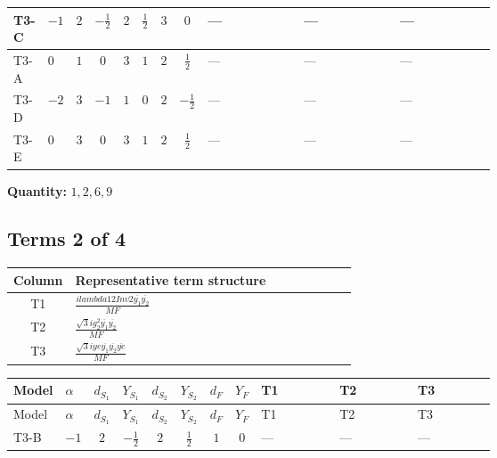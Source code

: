 \documentclass[8pt]{article}
\begin{document}
\begin{landscape}
\begin{longtable}{@{}llcccccc >{\raggedright\arraybackslash}p{0.21\linewidth} >{\raggedright\arraybackslash}p{0.21\linewidth} >{\raggedright\arraybackslash}p{0.21\linewidth}@{}}
\midrule
T3-C & $-1$ & $2$ & $-\frac{1}{2}$ & $2$ & $\frac{1}{2}$ & $3$ & $0$ & --- & --- & --- \\
\midrule
T3-A & $0$ & $1$ & $0$ & $3$ & $1$ & $2$ & $\frac{1}{2}$ & --- & --- & --- \\
\midrule
T3-D & $-2$ & $3$ & $-1$ & $1$ & $0$ & $2$ & $-\frac{1}{2}$ & --- & --- & --- \\
\midrule
T3-E & $0$ & $3$ & $0$ & $3$ & $1$ & $2$ & $\frac{1}{2}$ & --- & --- & --- \\
\midrule
\bottomrule
\end{longtable}
\clearpage
\noindent\textbf{Quantity: }$\mathrm{1,2,6,9}$\par\smallskip
\subsection*{Terms 2 of 4}
\begin{center}
\begin{tabular}{@{}c >{\raggedright\arraybackslash}p{0.82\linewidth}@{}}
\toprule
Column & Representative term structure \\
\midrule
T1 & \(\displaystyle \frac{i lambda12Inv2 \overline{y_{1}} \overline{y_{2}}}{MF}\) \\
\midrule
T2 & \(\displaystyle \frac{\sqrt{3} i g_{2}^{2} \overline{y_{1}} \overline{y_{2}}}{MF}\) \\
\midrule
T3 & \(\displaystyle \frac{\sqrt{3} i ye \overline{y_{1}} \overline{y_{2}} \overline{ye}}{MF}\) \\
\midrule
\bottomrule
\end{tabular}
\end{center}
\smallskip
\tiny
\begin{longtable}{@{}llcccccc >{\raggedright\arraybackslash}p{0.21\linewidth} >{\raggedright\arraybackslash}p{0.21\linewidth} >{\raggedright\arraybackslash}p{0.21\linewidth}@{}}
\toprule
Model & $\alpha$ & $d_{S_1}$ & $Y_{S_1}$ & $d_{S_2}$ & $Y_{S_2}$ & $d_F$ & $Y_F$ & T1 & T2 & T3 \\
\midrule
\endfirsthead
\toprule
Model & $\alpha$ & $d_{S_1}$ & $Y_{S_1}$ & $d_{S_2}$ & $Y_{S_2}$ & $d_F$ & $Y_F$ & T1 & T2 & T3 \\
\midrule
\endhead
T3-B & $-1$ & $2$ & $-\frac{1}{2}$ & $2$ & $\frac{1}{2}$ & $1$ & $0$ & --- & --- & --- \\
\midrule

\end{longtable}
\end{landscape}
\end{document}
